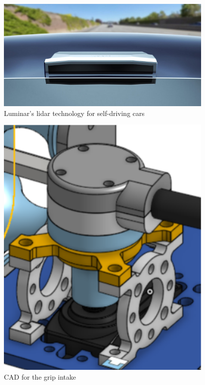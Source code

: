  
\begin{figure}[htp]
\centering
\includegraphics[width=0.95\textwidth, angle=0]{Meetings/February/02-07-23/luminar-iris-roof-mounted-lidar_100767931_m.jpg}
\caption{Luminar's lidar technology for self-driving cars}
\label{fig:pic1}
\end{figure}

\begin{figure}[htp]
\centering
\includegraphics[width=0.95\textwidth, angle=0]{Meetings/February/02-07-23/2-7-23_CAD.PNG}
\caption{CAD for the grip intake}
\label{fig:pic2}
\end{figure}

